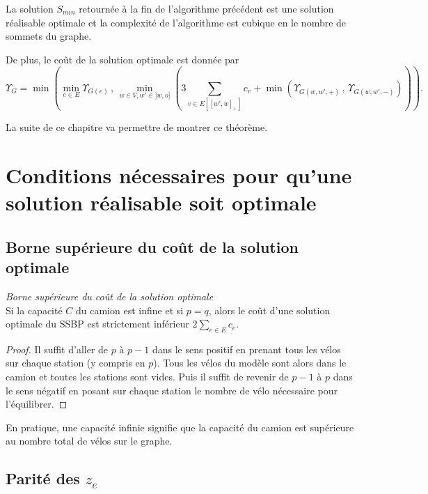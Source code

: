 \begin{thm} \label{thm: optimalité algo infini}
La solution $S_{min}$ retournée à la fin de l'algorithme précédent est une solution réalisable optimale et la complexité de l'algorithme est cubique en le nombre de sommets du graphe.

De plus, le coût de la solution optimale est donnée par
$$
\Upsilon_{G} = \min
\left(
  \min_{e \in E} \Upsilon_{G(e)}\,,\,
  \min_{w \in V, w' \in ]w,o]}
  \left(
    3 \sum_{ v \in E\left[ \left[w',w\right]_+ \right] }c_v + \min \left( \Upsilon_{G(w,w',+)} \,,\, \Upsilon_{G(w,w',-)} \right)
  \right)
\right).
$$
\end{thm}

La suite de ce chapitre va permettre de montrer ce théorème.

\section{Conditions nécessaires pour qu'une solution réalisable soit optimale}

\subsection{Borne supérieure du coût de la solution optimale}

\begin{lem}\label{capacite infinie - borne sup cout}
\emph{Borne supérieure du coût de la solution optimale}\\
Si la capacité $C$ du camion est infine et si $p=q$, alors le coût d'une solution optimale du SSBP est strictement inférieur $\displaystyle 2\sum_{e \in E}c_e$.
\end{lem}

\begin{proof}
Il suffit d'aller de $p$ à $p-1$ dans le sens positif en prenant tous les vélos sur chaque station (y compris en $p$). Tous les vélos du modèle sont alors dans le camion et toutes les stations sont vides. Puis il suffit de revenir de $p-1$ à $p$ dans le sens négatif en posant sur chaque station le nombre de vélo nécessaire pour l'équilibrer.
\end{proof}

En pratique, une capacité infinie signifie que la capacité du camion est supérieure au nombre total de vélos sur le graphe.

\subsection{Parité des $z_e$}

